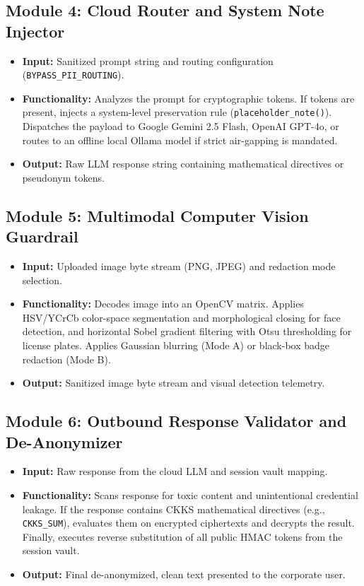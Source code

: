 \documentclass[12pt,a4paper,oneside]{report}
\numberwithin{equation}{chapter}
\begin{document}
\subsection{Module 4: Cloud Router and System Note Injector}
\begin{itemize}[leftmargin=*]
    \item \textbf{Input:} Sanitized prompt string and routing configuration (\texttt{BYPASS\_PII\_ROUTING}).
    \item \textbf{Functionality:} Analyzes the prompt for cryptographic tokens. If tokens are present, injects a system-level preservation rule (\texttt{placeholder\_note()}). Dispatches the payload to Google Gemini 2.5 Flash, OpenAI GPT-4o, or routes to an offline local Ollama model if strict air-gapping is mandated.
    \item \textbf{Output:} Raw LLM response string containing mathematical directives or pseudonym tokens.
\end{itemize}

\subsection{Module 5: Multimodal Computer Vision Guardrail}
\begin{itemize}[leftmargin=*]
    \item \textbf{Input:} Uploaded image byte stream (PNG, JPEG) and redaction mode selection.
    \item \textbf{Functionality:} Decodes image into an OpenCV matrix. Applies HSV/YCrCb color-space segmentation and morphological closing for face detection, and horizontal Sobel gradient filtering with Otsu thresholding for license plates. Applies Gaussian blurring (Mode A) or black-box badge redaction (Mode B).
    \item \textbf{Output:} Sanitized image byte stream and visual detection telemetry.
\end{itemize}

\subsection{Module 6: Outbound Response Validator and De-Anonymizer}
\begin{itemize}[leftmargin=*]
    \item \textbf{Input:} Raw response from the cloud LLM and session vault mapping.
    \item \textbf{Functionality:} Scans response for toxic content and unintentional credential leakage. If the response contains CKKS mathematical directives (e.g., \texttt{CKKS\_SUM}), evaluates them on encrypted ciphertexts and decrypts the result. Finally, executes reverse substitution of all public HMAC tokens from the session vault.
    \item \textbf{Output:} Final de-anonymized, clean text presented to the corporate user.
\end{itemize}
\end{document}
